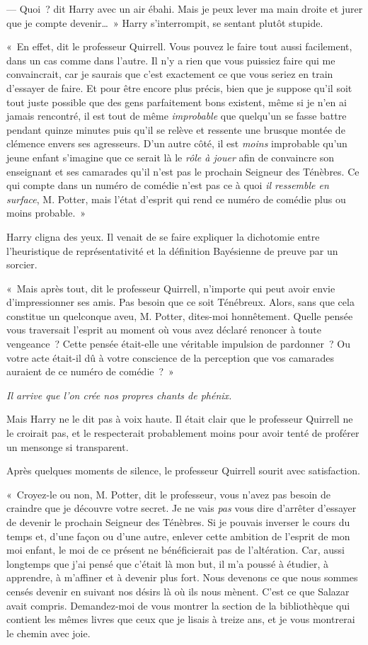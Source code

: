 --- Quoi~? dit Harry avec un air ébahi.
Mais je peux lever ma main droite et jurer que je compte devenir…~»
Harry s'interrompit, se sentant plutôt stupide.

«~En effet, dit le professeur Quirrell.
Vous pouvez le faire tout aussi facilement, dans un cas comme dans l'autre.
Il n'y a rien que vous puissiez faire qui me convaincrait, car je saurais que c'est exactement ce que vous seriez en train d'essayer de faire.
Et pour être encore plus précis, bien que je suppose qu'il soit tout juste possible que des gens parfaitement bons existent, même si je n'en ai jamais rencontré, il est tout de même \emph{improbable} que quelqu'un se fasse battre pendant quinze minutes puis qu'il se relève et ressente une brusque montée de clémence envers ses agresseurs.
D'un autre côté, il est \emph{moins} improbable qu'un jeune enfant s'imagine que ce serait là le \emph{rôle à jouer} afin de convaincre son enseignant et ses camarades qu'il n'est pas le prochain Seigneur des Ténèbres.
Ce qui compte dans un numéro de comédie n'est pas ce à quoi \emph{il ressemble en surface}, M. Potter, mais l'état d'esprit qui rend ce numéro de comédie plus ou moins probable.~»

Harry cligna des yeux.
Il venait de se faire expliquer la dichotomie entre l'heuristique de représentativité et la définition Bayésienne de preuve par un sorcier.

«~Mais après tout, dit le professeur Quirrell, n'importe qui peut avoir envie d'impressionner ses amis.
Pas besoin que ce soit Ténébreux.
Alors, sans que cela constitue un quelconque aveu, M. Potter, dites-moi honnêtement.
Quelle pensée vous traversait l'esprit au moment où vous avez déclaré renoncer à toute vengeance~?
Cette pensée était-elle une véritable impulsion de pardonner~?
Ou votre acte était-il dû à votre conscience de la perception que vos camarades auraient de ce numéro de comédie~?~»

\emph{Il arrive que l'on crée nos propres chants de phénix.}

Mais Harry ne le dit pas à voix haute.
Il était clair que le professeur Quirrell ne le croirait pas, et le respecterait probablement moins pour avoir tenté de proférer un mensonge si transparent.

Après quelques moments de silence, le professeur Quirrell sourit avec satisfaction.

«~Croyez-le ou non, M. Potter, dit le professeur, vous n'avez pas besoin de craindre que je découvre votre secret.
Je ne vais \emph{pas} vous dire d'arrêter d'essayer de devenir le prochain Seigneur des Ténèbres.
Si je pouvais inverser le cours du temps et, d'une façon ou d'une autre, enlever cette ambition de l'esprit de mon moi enfant, le moi de ce présent ne bénéficierait pas de l'altération.
Car, aussi longtemps que j'ai pensé que c'était là mon but, il m'a poussé à étudier, à apprendre, à m'affiner et à devenir plus fort.
Nous devenons ce que nous sommes censés devenir en suivant nos désirs là où ils nous mènent.
C'est ce que Salazar avait compris.
Demandez-moi de vous montrer la section de la bibliothèque qui contient les mêmes livres que ceux que je lisais à treize ans, et je vous montrerai le chemin avec joie.

